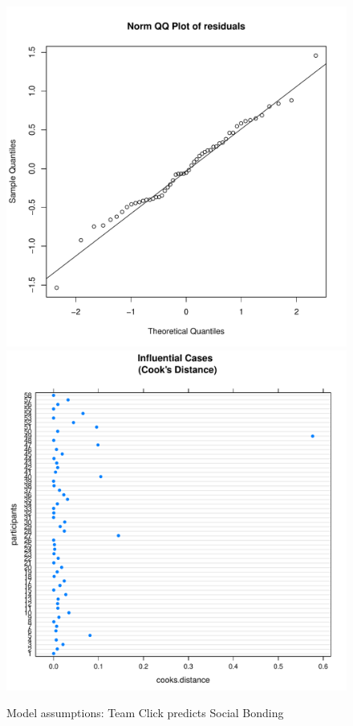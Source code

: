 \begin{CJK}{UTF8}{gbsn}
\begin{figure}[htbp]
    \includegraphics[scale =.4]{images/TEM2QQNorm.pdf}
    \includegraphics[scale =.4]{images/TEM2CooksD.pdf}
    \caption{Model assumptions: Team Click predicts Social Bonding}
    \label{fig:M2Assumptions}
\end{figure}



\end{CJK}
